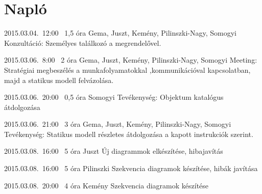 %
\section{Napló}

\begin{naplo}
	
\bejegyzes
{2015.03.04.~12:00~} %
{1,5 óra} %
{Gema, Juszt, Kemény, Pilinszki-Nagy, Somogyi} %
{Konzultáció: Személyes találkozó a megrendelővel.} %

\bejegyzes
{2015.03.06.~8:00~} %
{2 óra} %
{Gema, Juszt, Kemény, Pilinszki-Nagy, Somogyi} %
{Meeting: Stratégiai megbeszélés a munkafolyamatokkal ,kommunikációval kapcsolatban, majd a statikus modell felvázolása.} %

\bejegyzes
{2015.03.06.~20:00~} %
{0,5 óra} %
{Somogyi} %
{Tevékenység: Objektum katalógus átdolgozása} %

\bejegyzes
{2015.03.06.~21:00~}
{3 óra}
{Gema, Juszt, Kemény, Pilinszki-Nagy, Somogyi}
{Tevékenység: Statikus modell részletes átdolgozása a kapott instrukciók szerint.}

\bejegyzes
{2015.03.08.~16:00~} %
{5 óra} %
{Juszt} %
{Új diagrammok elkészítése, hibajavítás} %

\bejegyzes
{2015.03.08.~16:00~} %
{5 óra} %
{Pilinszki} %
{Szekvencia diagramok készítése, hibák javítása} %

\bejegyzes
{2015.03.08.~20:00~} %
{4 óra} %
{Kemény} %
{Szekvencia diagramok készítése} %


\end{naplo}

